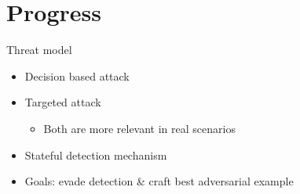 \documentclass[11pt,t]{beamer}
\begin{document}
\section{Progress}
\begin{frame}{Threat model}
\begin{itemize}
	\item Decision based attack
	\item Targeted attack
	\begin{itemize}
		\item Both are more relevant in real scenarios
	\end{itemize}
	\item Stateful detection mechanism
	\item Goals: evade detection \& craft best adversarial example	
\end{itemize}
\end{frame}
\end{document}
